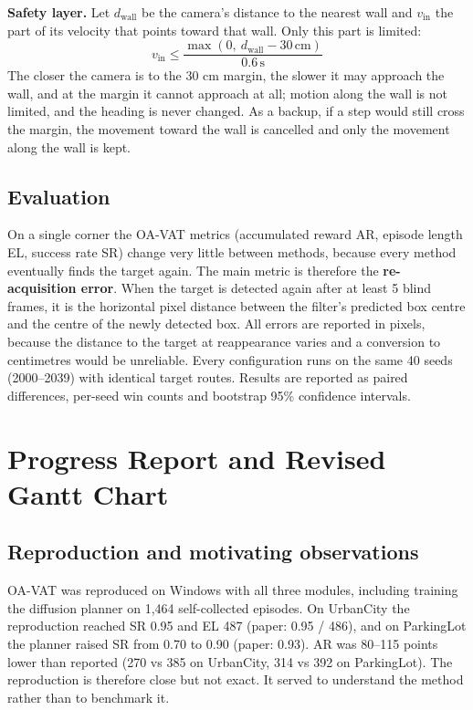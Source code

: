 \documentclass[12pt,a4paper]{article}
\begin{document}
\textbf{Safety layer.} Let $d_{\mathrm{wall}}$ be the camera's distance to the nearest wall and $v_{\mathrm{in}}$ the part of its velocity that points toward that wall. Only this part is limited:
\begin{equation}
  v_{\mathrm{in}} \le \frac{\max(0,\ d_{\mathrm{wall}}-30\,\mathrm{cm})}{0.6\,\mathrm{s}}
\end{equation}
The closer the camera is to the 30 cm margin, the slower it may approach the wall, and at the margin it cannot approach at all; motion along the wall is not limited, and the heading is never changed. As a backup, if a step would still cross the margin, the movement toward the wall is cancelled and only the movement along the wall is kept.

\subsection{Evaluation}
On a single corner the OA-VAT metrics (accumulated reward AR, episode length EL, success rate SR) change very little between methods, because every method eventually finds the target again. The main metric is therefore the \textbf{re-acquisition error}. When the target is detected again after at least 5 blind frames, it is the horizontal pixel distance between the filter’s predicted box centre and the centre of the newly detected box. All errors are reported in pixels, because the distance to the target at reappearance varies and a conversion to centimetres would be unreliable. Every configuration runs on the same 40 seeds (2000–2039) with identical target routes. Results are reported as paired differences, per-seed win counts and bootstrap 95\% confidence intervals.

\section{Progress Report and Revised Gantt Chart}
\subsection{Reproduction and motivating observations}
OA-VAT was reproduced on Windows with all three modules, including training the diffusion planner on 1,464 self-collected episodes. On UrbanCity the reproduction reached SR 0.95 and EL 487 (paper: 0.95 / 486), and on ParkingLot the planner raised SR from 0.70 to 0.90 (paper: 0.93). AR was 80–115 points lower than reported (270 vs 385 on UrbanCity, 314 vs 392 on ParkingLot). The reproduction is therefore close but not exact. It served to understand the method rather than to benchmark it.
\end{document}
